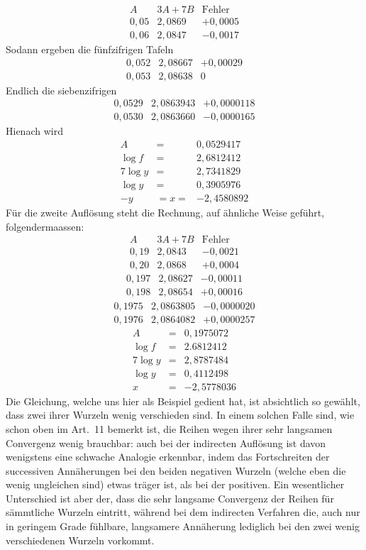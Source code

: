 \[
\begin{array}{r|r|r}
A&3A+7B&\mathrm{Fehler}\\\hline
0{,}05&2{,}0869&+0{,}0005\\
0{,}06&2{,}0847&-0{,}0017
\end{array}
\]
Sodann ergeben die fünfzifrigen Tafeln
\[
\begin{array}{r|r|r}
0{,}052&2{,}08667&+0{,}00029\\
0{,}053&2{,}08638&0
\end{array}
\]
Endlich die siebenzifrigen
\[
\begin{array}{r|r|r}
0{,}0529&2{,}0863943&+0{,}0000118\\
0{,}0530&2{,}0863660&-0{,}0000165
\end{array}
\]
Hienach wird
\[
\begin{array}{rcl}
A&=&0{,}0529417\\
\log f&=&2{,}6812412\\
7\log y&=&2{,}7341829\\
\log y&=&0{,}3905976\\
-y&=x=&-2{,}4580892
\end{array}
\]
Für die zweite Auflösung steht die Rechnung, auf ähnliche Weise geführt, folgendermaassen:
\[
\begin{array}{r|r|r}
A&3A+7B&\mathrm{Fehler}\\\hline
0{,}19&2{,}0843&-0{,}0021\\
0{,}20&2{,}0868&+0{,}0004
\end{array}
\]
\[
\begin{array}{r|r|r}
0{,}197&2{,}08627&-0{,}00011\\
0{,}198&2{,}08654&+0{,}00016
\end{array}
\]
\[
\begin{array}{r|r|r}
0{,}1975&2{,}0863805&-0{,}0000020\\
0{,}1976&2{,}0864082&+0{,}0000257
\end{array}
\]
\[
\begin{array}{rcl}
A&=&0{,}1975072\\
\log f&=&2.6812412\\\hline
7\log y&=&2{,}8787484\\
\log y&=&0{,}4112498\\
x&=&-2{,}5778036
\end{array}
\]
Die Gleichung, welche uns hier als Beispiel gedient hat, ist absichtlich so
gewählt, dass zwei ihrer Wurzeln wenig verschieden sind. In einem solchen
Falle sind, wie schon oben im Art.\ 11 bemerkt ist, die Reihen wegen ihrer sehr
langsamen Convergenz wenig brauchbar: auch bei der indirecten Auflösung ist
davon wenigstens eine schwache Analogie erkennbar, indem das Fortschreiten der
successiven Annäherungen bei den beiden negativen Wurzeln (welche eben die
wenig ungleichen sind) etwas träger ist, als bei der positiven. Ein wesentlicher
Unterschied ist aber der, dass die sehr langsame Convergenz der Reihen für sämmtliche Wurzeln eintritt, während bei dem indirecten Verfahren die, auch nur in
geringem Grade fühlbare, langsamere Annäherung lediglich bei den zwei wenig
verschiedenen Wurzeln vorkommt.

